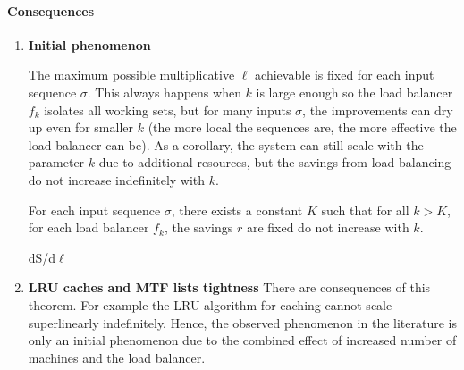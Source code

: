 \paragraph*{Consequences}
\begin{enumerate}
	\item 
\textbf{Initial phenomenon}

The maximum possible multiplicative $\ell$ achievable is fixed for each input sequence $\sigma$. 
This always happens when $k$ is large enough so the load balancer $f_k$ isolates all working sets, but for many inputs $\sigma$, the improvements can dry up even for smaller $k$ (the more local the sequences are, the more effective the load balancer can be).
As a corollary, the system can still scale with the parameter $k$ due to additional resources, but the savings from load balancing do not increase indefinitely with $k$.
\begin{observation}
	For each input sequence $\sigma$, there exists a constant $K$ such that for all $k > K$, for each load balancer $f_k$, the savings $r$ are fixed do not increase with $k$.

	dS/d$\ell$
\end{observation}


 \item \textbf{LRU caches and MTF lists tightness}
 There are consequences of this theorem. For example the LRU algorithm for caching cannot scale superlinearly indefinitely. Hence, the observed phenomenon in the literature is only an initial phenomenon due to the combined effect of increased number of machines and the load balancer.
\end{enumerate}

